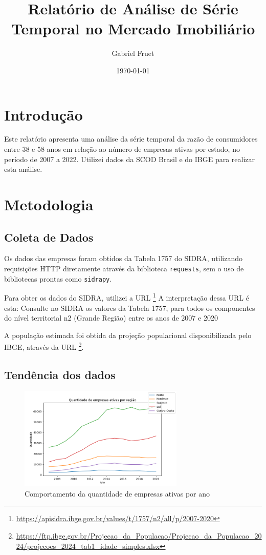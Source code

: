 \documentclass[12pt]{article}
\title{Relatório de Análise de Série Temporal no Mercado Imobiliário}
\author{Gabriel Fruet} \date{\today}
\begin{document}
\maketitle

\section{Introdução} Este relatório apresenta uma análise da série temporal da
razão de consumidores entre 38 e 58 anos em relação ao número de empresas
ativas por estado, no período de 2007 a 2022. Utilizei dados da SCOD Brasil e
do IBGE para realizar esta análise.

\section{Metodologia} 

\subsection{Coleta de Dados} 

Os dados das empresas foram
obtidos da Tabela 1757 do SIDRA, utilizando requisições HTTP diretamente
através da biblioteca \texttt{requests}, sem o uso de bibliotecas prontas como
\texttt{sidrapy}. 

Para obter os dados do SIDRA, utilizei a URL 
\footnote{\url{https://apisidra.ibge.gov.br/values/t/1757/n2/all/p/2007-2020}}
 A interpretação
dessa URL é esta: Consulte no SIDRA os valores da Tabela 1757, para todos os
componentes do  nível territorial n2 (Grande Região) entre os anos de 2007 e
2020

A população estimada foi obtida da projeção populacional
disponibilizada pelo IBGE, através da URL 
\footnote{\url{https://ftp.ibge.gov.br/Projecao_da_Populacao/Projecao_da_Populacao_2024/projecoes_2024_tab1_idade_simples.xlsx}}.


\subsection{Tendência dos dados}

\begin{figure}[!htbp]
    \begin{center}
    \includegraphics[width=0.7\textwidth]{../figures/time_series_business.png}
    \caption{\label{fig:trend_bus} Comportamento da quantidade de empresas ativas por ano}
    \end{center}
\end{figure}
\end{document}
